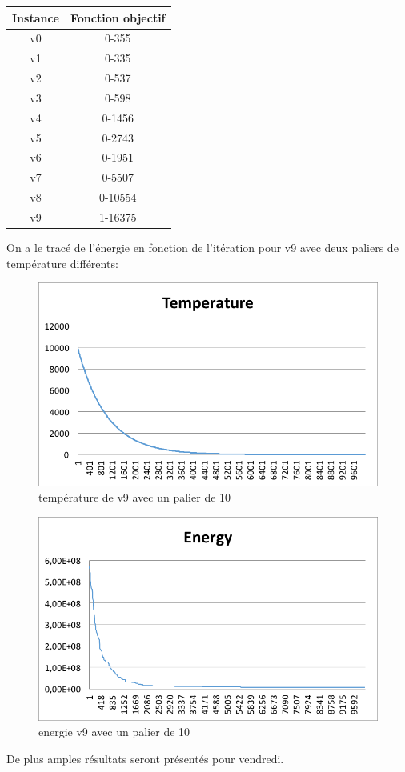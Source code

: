 \documentclass[a4paper, 11pt]{article} %
\begin{document}
\begin{center}
\begin{tabular}{|c|c|}
 \hline 
 Instance & Fonction objectif \\ \hline
 v0 &  0-355\\ \hline
 v1 &  0-335\\ \hline
 v2 &  0-537\\ \hline
 v3 &  0-598 \\ \hline
 v4 &  0-1456 \\ \hline
 v5 &  0-2743 \\ \hline
 v6 &  0-1951 \\ \hline
 v7 &  0-5507\\ \hline
 v8 &  0-10554\\ \hline
 v9 &  1-16375\\ \hline

\end{tabular}
\end{center}

On a le tracé de l'énergie en fonction de l'itération pour v9 avec deux paliers de température différents:
\begin{center}

\begin{figure}
\caption{température de v9 avec un palier de 10}
\includegraphics{v9-p10-it10000-temp.png}
\end{figure}

\begin{figure}
\caption{energie v9 avec un palier de 10}
\includegraphics{v9-p10-it10000-energy.png}
\end{figure}

\end{center}

De plus amples résultats seront présentés pour vendredi.
\end{document}
